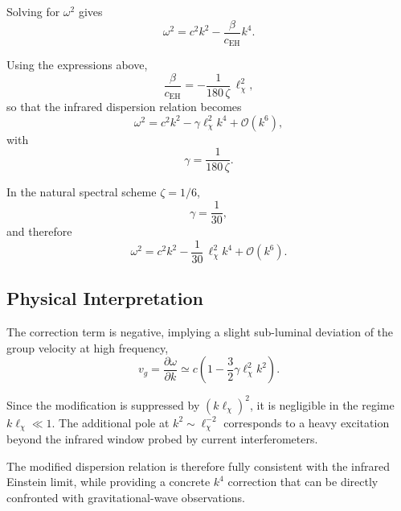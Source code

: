     Solving for $\omega^2$ gives
    \[
      \omega^2 = c^2 k^2 - \frac{\beta}{c_{\mathrm{EH}}} k^4.
    \]

    Using the expressions above,
    \[
      \frac{\beta}{c_{\mathrm{EH}}} = -\frac{1}{180\,\zeta}\, \ell_\chi^2,
    \]
    so that the infrared dispersion relation becomes
    \[
      \omega^2 = c^2 k^2 - \gamma \ell_\chi^2 k^4 + \mathcal{O}(k^6),
    \]
    with
    \[
      \gamma = \frac{1}{180\,\zeta}.
    \]

    In the natural spectral scheme $\zeta=1/6$,
    \[
      \gamma = \frac{1}{30},
    \]
    and therefore
    \[
      \omega^2 = c^2 k^2 - \frac{1}{30}\, \ell_\chi^2 k^4 + \mathcal{O}(k^6).
    \]

  \subsection{Physical Interpretation}
    \label{subsec:physical-interpretation}

    The correction term is negative, implying a slight sub-luminal deviation of the group velocity at high frequency,
    \[
      v_g = \frac{\partial \omega}{\partial k} \simeq c \left( 1 - \frac{3}{2}\gamma \ell_\chi^2 k^2 \right).
    \]

    Since the modification is suppressed by $(k\ell_\chi)^2$, it is negligible in the regime $k\ell_\chi \ll 1$.
    The additional pole at $k^2 \sim \ell_\chi^{-2}$ corresponds to a heavy excitation beyond the
    infrared window probed by current interferometers.

    The modified dispersion relation is therefore fully consistent with the infrared Einstein limit,
    while providing a concrete $k^4$ correction that can be directly confronted with gravitational-wave observations.
